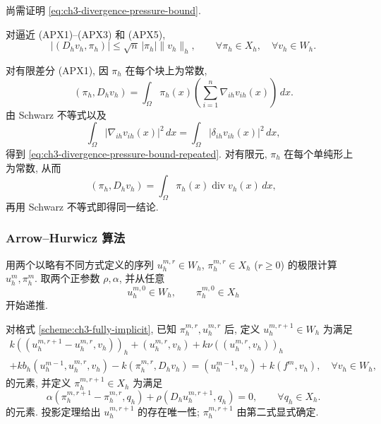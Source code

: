 \hypertarget{chapter-03-page-280}{}
尚需证明 \eqref{eq:ch3-divergence-pressure-bound}.

\begin{Lemma}
\label{lem:ch3-divergence-pressure-bound}
对逼近 (APX1)--(APX3) 和 (APX5),
\begin{equation}
|(D_hv_h,\pi_h)|\leq\sqrt n\,|\pi_h|\lVert v_h\rVert_h,
\qquad\forall\pi_h\in X_h,\quad\forall v_h\in W_h.
\label{eq:ch3-divergence-pressure-bound-repeated}
\end{equation}
\end{Lemma}

\begin{Proof}
对有限差分 (APX1), 因 $\pi_h$ 在每个块上为常数,
\[
(\pi_h,D_hv_h)=\int_\Omega\pi_h(x)\left(\sum_{i=1}^n\nabla_{ih}v_{ih}(x)\right)\,dx.
\]
由 Schwarz 不等式以及
\[
\int_\Omega|\nabla_{ih}v_{ih}(x)|^2\,dx
=\int_\Omega|\delta_{ih}v_{ih}(x)|^2\,dx,
\]
得到 \eqref{eq:ch3-divergence-pressure-bound-repeated}. 对有限元, $\pi_h$ 在每个单纯形上为常数, 从而
\[
(\pi_h,D_hv_h)=\int_\Omega\pi_h(x)\operatorname{div}v_h(x)\,dx,
\]
再用 Schwarz 不等式即得同一结论.
\end{Proof}

\subsubsection{Arrow--Hurwicz 算法}
用两个以略有不同方式定义的序列 $u_h^{m,r}\in W_h$, $\pi_h^{m,r}\in X_h$ ($r\geq0$) 的极限计算 $u_h^m,\pi_h^m$. 取两个正参数 $\rho,\alpha$, 并从任意
\begin{equation}
u_h^{m,0}\in W_h,\qquad\pi_h^{m,0}\in X_h
\label{eq:ch3-arrow-hurwicz-initial-data}
\end{equation}
开始递推.

\hypertarget{chapter-03-page-281}{}
对格式 \ref{scheme:ch3-fully-implicit}, 已知 $\pi_h^{m,r},u_h^{m,r}$ 后, 定义 $u_h^{m,r+1}\in W_h$ 为满足
\begin{equation}
\begin{split}
k((u_h^{m,r+1}-u_h^{m,r},v_h))_h+(u_h^{m,r},v_h)
+k\nu((u_h^{m,r},v_h))_h\\
+kb_h(u_h^{m-1},u_h^{m,r},v_h)-k(\pi_h^{m,r},D_hv_h)
=(u_h^{m-1},v_h)+k(f^m,v_h),\quad\forall v_h\in W_h,
\end{split}
\label{eq:ch3-arrow-hurwicz-scheme51}
\end{equation}
的元素, 并定义 $\pi_h^{m,r+1}\in X_h$ 为满足
\begin{equation}
\alpha(\pi_h^{m,r+1}-\pi_h^{m,r},q_h)
+\rho(D_hu_h^{m,r+1},q_h)=0,
\qquad\forall q_h\in X_h.
\label{eq:ch3-arrow-hurwicz-pressure-update}
\end{equation}
的元素. 投影定理给出 $u_h^{m,r+1}$ 的存在唯一性; $\pi_h^{m,r+1}$ 由第二式显式确定.

